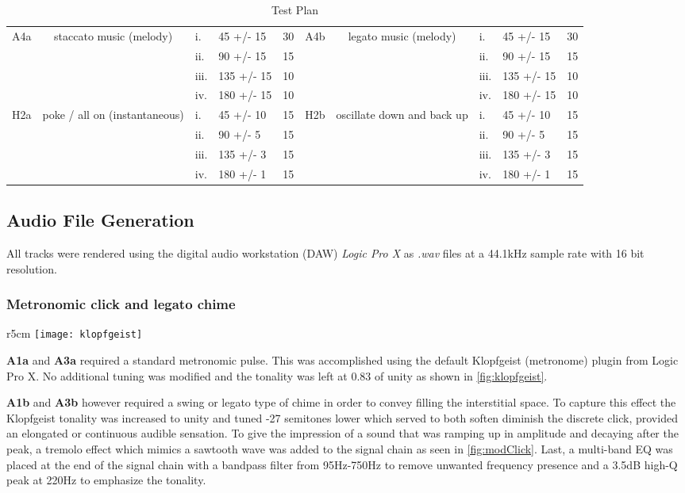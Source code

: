 \begin{table}[]
{\begin{tabular}{cclllcclll}
    \multirow{4}{*}{A4a} & \multirow{4}{*}{staccato music (melody)} & i. & 45 +/- 15 & 30 & \multirow{4}{*}{A4b} & \multirow{4}{*}{legato music (melody)} & i. & 45 +/- 15 & 30 \\
     &  & ii. & 90 +/- 15 & 15 &  &  & ii. & 90 +/- 15 & 15 \\
     &  & iii. & 135 +/- 15 & 10 &  &  & iii. & 135 +/- 15 & 10 \\
     &  & iv. & 180 +/- 15 & 10 &  &  & iv. & 180 +/- 15 & 10 \\
    \multirow{4}{*}{H2a} & \multirow{4}{*}{poke / all on (instantaneous)} & i. & 45 +/- 10 & 15 & \multirow{4}{*}{H2b} & \multirow{4}{*}{oscillate down and back up} & i. & 45 +/- 10 & 15 \\
     &  & ii. & 90 +/- 5 & 15 &  &  & ii. & 90 +/- 5 & 15 \\
     &  & iii. & 135 +/- 3 & 15 &  &  & iii. & 135 +/- 3 & 15 \\
     &  & iv. & 180 +/- 1 & 15 &  &  & iv. & 180 +/- 1 & 15
    \end{tabular}%
    }
    \caption{Test Plan}
    \label{fig:TestPlan}
\end{table}

\subsection{Audio File Generation}
All tracks were rendered using the digital audio workstation (DAW) \textit{Logic Pro X} as \textit{.wav} files at a 44.1kHz sample rate with 16 bit resolution.
\subsubsection{Metronomic click and legato chime}
\begin{wrapfigure}[8]{r}{5cm}
    \centering
    \texttt{[image: klopfgeist]}
    \caption{Default metronome}
    \label{fig:klopfgeist}
\end{wrapfigure}
\textbf{A1a} and \textbf{A3a} required a standard metronomic pulse. This was accomplished using the default Klopfgeist (metronome) plugin from Logic Pro X. No additional tuning was modified and the tonality was left at 0.83 of unity as shown in \ref{fig:klopfgeist}. 

\textbf{A1b} and \textbf{A3b} however required a swing or legato type of chime in order to convey filling the interstitial space. To capture this effect the Klopfgeist tonality was increased to unity and tuned -27 semitones lower which served to both soften diminish the discrete click, provided an elongated or continuous audible sensation. To give the impression of a sound that was ramping up in amplitude and decaying after the peak, a tremolo effect which mimics a sawtooth wave was added to the signal chain as seen in \ref{fig:modClick}. Last, a multi-band EQ was placed at the end of the signal chain with a bandpass filter from 95Hz-750Hz to remove unwanted frequency presence and a 3.5dB high-Q peak at 220Hz to emphasize the tonality.

